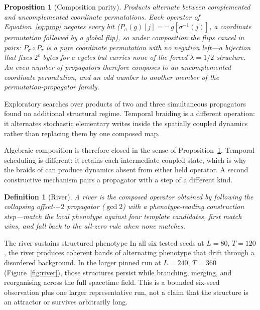 \documentclass[man,12pt,floatsintext,donotrepeattitle]{apa7}
\newcommand{\sig}{\sigma}
\newcommand{\secref}[1]{\emph{\nameref{#1}}}
\newtheorem{proposition}{Proposition}
\newtheorem{definition}{Definition}
\begin{document}
\begin{proposition}[Composition parity]\label{obs:flat}
Products alternate between complemented and uncomplemented coordinate permutations.
Each operator of Equation~\eqref{eq:prop} negates every bit
($P_\sig(g)[j] = \lnot\,g[\sig^{-1}(j)]$, a coordinate permutation followed by a
global flip), so under composition the flips cancel in pairs: $P_\sig \circ
P_\tau$ is a \emph{pure} coordinate permutation with no negation left---a
bijection that fixes $2^{c}$ bytes for $c$ cycles but carries none of the forced
$\lambda = 1/2$ structure. An even number of propagators therefore composes to
an uncomplemented coordinate permutation, and an odd number to another member
of the permutation-propagator family.
\end{proposition}

Exploratory searches over products of two and three simultaneous propagators
found no additional structural regime. Temporal braiding is a different
operation: it alternates stochastic elementary writes inside the spatially
coupled dynamics rather than replacing them by one composed map.

Algebraic composition is therefore closed in the sense of
Proposition~\ref{obs:flat}. Temporal scheduling is different: it retains each
intermediate coupled state, which is why the braids of
\secref{sec:braiding} can produce dynamics absent from either held operator. A
second constructive mechanism pairs a propagator with a step of a different
kind.

\begin{definition}[River]\label{def:river}
A \emph{river} is the composed operator obtained by following the collapsing
offset-$+2$ propagator ($\gcd 2$) with a phenotype-reading construction
step---match the local phenotype against four template candidates, first match
wins, and fall back to the all-zero rule when none matches.
\end{definition}

\begin{empiricalfinding}[label={find:river}]{The river sustains structured phenotype}
In all six tested seeds at $L=80$, $T=120$, the river produces coherent bands
of alternating phenotype that drift through a disordered background. In the
larger pinned run at $L=240$, $T=360$ (Figure~\ref{fig:river}), those structures
persist while branching, merging, and reorganising across the full spacetime
field. This is a bounded six-seed observation plus one larger representative
run, not a claim that the structure is an attractor or survives arbitrarily
long.
\end{empiricalfinding}
\end{document}

